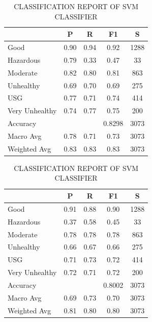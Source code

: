 \documentclass[a4paper,fleqn]{cas-dc}
\begin{document}
\vspace{1cm}

\begin{table}[h!]
\centering
\begin{minipage}{0.48\textwidth}
\centering
\caption{CLASSIFICATION REPORT OF MLP CLASSIFIER}
\label{tab:mlp_details}
\begin{tabular}{|l|c|c|c|c|}
\hline
 & \textbf{P} & \textbf{R} & \textbf{F1} & \textbf{S} \\
\hline
Good & 0.90 & 0.94 & 0.92 & 1288 \\
Hazardous & 0.79 & 0.33 & 0.47 & 33 \\
Moderate & 0.82 & 0.80 & 0.81 & 863 \\
Unhealthy & 0.69 & 0.70 & 0.69 & 275 \\
USG & 0.77 & 0.71 & 0.74 & 414 \\
Very Unhealthy & 0.74 & 0.77 & 0.75 & 200 \\
\hline
Accuracy &  &  & 0.8298 & 3073 \\
Macro Avg & 0.78 & 0.71 & 0.73 & 3073 \\
Weighted Avg & 0.83 & 0.83 & 0.83 & 3073 \\
\hline
\end{tabular}
\end{minipage}
\hfill
\begin{minipage}{0.48\textwidth}
\centering
\caption{CLASSIFICATION REPORT OF SVM CLASSIFIER}
\label{tab:svm_details}
\begin{tabular}{|l|c|c|c|c|}
\hline
 & \textbf{P} & \textbf{R} & \textbf{F1} & \textbf{S} \\
\hline
Good & 0.91 & 0.88 & 0.90 & 1288 \\
Hazardous & 0.37 & 0.58 & 0.45 & 33 \\
Moderate & 0.78 & 0.78 & 0.78 & 863 \\
Unhealthy & 0.66 & 0.67 & 0.66 & 275 \\
USG & 0.71 & 0.73 & 0.72 & 414 \\
Very Unhealthy & 0.72 & 0.71 & 0.72 & 200 \\
\hline
Accuracy &  &  & 0.8002 & 3073 \\
Macro Avg & 0.69 & 0.73 & 0.70 & 3073 \\
Weighted Avg & 0.81 & 0.80 & 0.80 & 3073 \\
\hline
\end{tabular}
\end{minipage}
\end{table}
\end{document}
